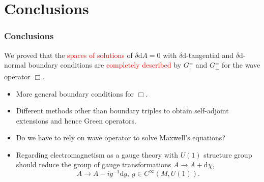 \documentclass[10pt]{beamer} %
\newcommand{\red}[1]{\textcolor{red}{#1}}
\begin{document}
\section{Conclusions}

\begin{frame}
	\frametitle{Conclusions}
	We proved that the \red{spaces of solutions} of $\delta\mathrm{d}A=0$ with $\delta\mathrm{d}$-tangential and $\delta\mathrm{d}$-normal boundary conditions are \red{completely described} by $G_\parallel^\pm$ and $G_\perp^\pm$ for the {wave operator} $\Box$.
	
	\begin{itemize}[<+-| alert@+>]
		\item More general boundary conditions for $\Box$.
		\item Different methods other than boundary triples to obtain self-adjoint extensions and hence Green operators.
		
		\item Do we have to rely on wave operator to solve Maxwell's equations?
		\item Regarding electromagnetism as a gauge theory with $U(1)$ structure group should reduce the group of gauge transformations $A\to A+\mathrm{d}\chi$,
		\[	A\to A-ig^{-1}\mathrm{d}g,\ g\in C^\infty(M,U(1)).	\]
		
		
	
	\end{itemize}

	
\end{frame}
\end{document}
